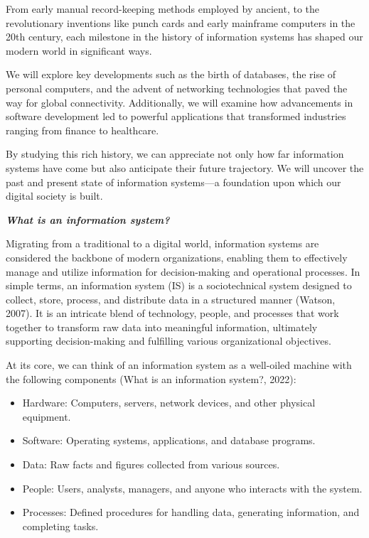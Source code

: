 \documentclass[
  letterpaper,
  DIV=11,
  numbers=noendperiod]{scrreprt}
\providecommand{\tightlist}{%
  \setlength{\itemsep}{0pt}\setlength{\parskip}{0pt}}\usepackage{longtable,booktabs,array}
\begin{document}
From early manual record-keeping methods employed by ancient, to the
revolutionary inventions like punch cards and early mainframe computers
in the 20th century, each milestone in the history of information
systems has shaped our modern world in significant ways.

We will explore key developments such as the birth of databases, the
rise of personal computers, and the advent of networking technologies
that paved the way for global connectivity. Additionally, we will
examine how advancements in software development led to powerful
applications that transformed industries ranging from finance to
healthcare.

By studying this rich history, we can appreciate not only how far
information systems have come but also anticipate their future
trajectory. We will uncover the past and present state of information
systems---a foundation upon which our digital society is built.

\textbf{\emph{What is an information system?}}

Migrating from a traditional to a digital world, information systems are
considered the backbone of modern organizations, enabling them to
effectively manage and utilize information for decision-making and
operational processes. In simple terms, an information system (IS) is a
sociotechnical system designed to collect, store, process, and
distribute data in a structured manner (Watson, 2007). It is an
intricate blend of technology, people, and processes that work together
to transform raw data into meaningful information, ultimately supporting
decision-making and fulfilling various organizational objectives.

At its core, we can think of an information system as a well-oiled
machine with the following components (What is an information system?,
2022):

\begin{itemize}
\tightlist
\item
  Hardware: Computers, servers, network devices, and other physical
  equipment.
\item
  Software: Operating systems, applications, and database programs.
\item
  Data: Raw facts and figures collected from various sources.
\item
  People: Users, analysts, managers, and anyone who interacts with the
  system.
\item
  Processes: Defined procedures for handling data, generating
  information, and completing tasks.
\end{itemize}
\end{document}
